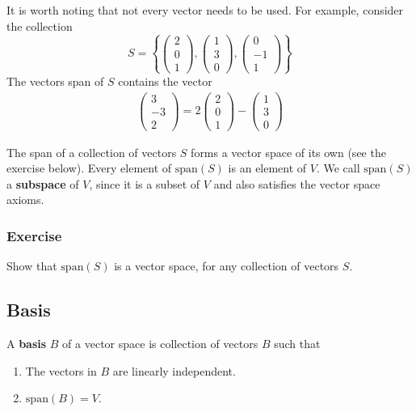 \documentclass[a4paper,12pt]{amsart}
\begin{document}
    It is worth noting that not every vector needs to be used. For example, consider the collection 
    \[ S = \left\{ \begin{pmatrix} 2 \\ 0 \\ 1 \end{pmatrix}, \begin{pmatrix} 1 \\ 3 \\ 0 \end{pmatrix}, \begin{pmatrix} 0 \\ -1 \\ 1 \end{pmatrix} \right\} \] 
    The vectors span of $S$ contains the vector
    \begin{align*}
        \begin{pmatrix} 3 \\ -3 \\ 2 \end{pmatrix} = 2 \begin{pmatrix} 2 \\ 0 \\ 1 \end{pmatrix} - \begin{pmatrix} 1 \\ 3 \\ 0 \end{pmatrix}
    \end{align*}

    The span of a collection of vectors $S$ forms a vector space of its own (see the exercise below). Every element of $\mathrm{span} (S)$ is an element of $V$. We call $\mathrm{span}(S)$ a \textbf{subspace} of $V$, since it is a subset of $V$ and also satisfies the vector space axioms.

    \subsubsection{Exercise} Show that $\mathrm{span}(S)$ is a vector space, for any collection of vectors $S$.

    \subsection{Basis}

    A \textbf{basis} $B$ of a vector space is collection of vectors $B$ such that
    \begin{enumerate}
        \item The vectors in $B$ are linearly independent.
        \item $\mathrm{span}(B) = V$.
    \end{enumerate}
\end{document}
